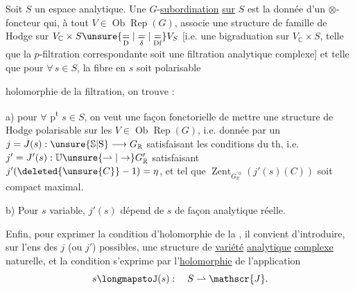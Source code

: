 
Soit $S$ un espace analytique. Une $G$-\uline{subordination}  \uline{sur} $S$ est la donnée d'un $\otimes$-foncteur qui, à tout $V\in\operatorname{Ob}\operatorname{Rep}(G)$, associe une structure de famille de Hodge  sur $V_{\mathbb{C}}\times S\unsure{\underset{\mathrm{D}}{=}|\underset{\delta}{=}|\underset{\mathrm{Df}}{=}}V_S$  [i.e. une bigraduation  sur $V_{\mathbb{C}}\times S$,  telle que la $p$-filtration correspondante soit une filtration analytique complexe] et telle que   pour  $\forall\,s\in S$, la fibre en $s$ soit polarisable 

 holomorphie de la filtration, on trouve :

a) pour $\forall$ p\textsuperscript{t} $s\in S$, on veut une façon  fonctorielle de mettre une structure de Hodge  polarisable sur les $V\in\operatorname{Ob}\operatorname{Rep}(G)$, i.e. donnée par un $j=J(s):\unsure{\mathbb{S}|\mathrm{S}}\longrightarrow G_{\mathbb{R}}$ satisfaisant les conditions du th, i.e. $j'=J'(s):\mathbb{U}\unsure{\rightharpoonup|\to}G'_{\mathbb{R}}$ satisfaisant $j'(\deleted{\unsure{C}}-1)=\eta$, et tel que $\operatorname{Zent}_{G_{\mathbb{R}}^{\prime\,0}}(j'(s)(C))$ soit compact maximal.

b) Pour $s$ variable, $j'(s)$ dépend de $s$ de façon analytique réelle.



Enfin, pour exprimer la condition d'holomorphie de la , il convient d'introduire,  sur l'ens  des $j$ (ou $j'$) possibles, une structure de \uline{variété} \uline{analytique} \uline{complexe} naturelle, et la condition s'exprime par l'\uline{holomorphie} de l'application
\[
s\longmapstoJ(s):\quad S\rightharpoonup\mathscr{J}.
\]

